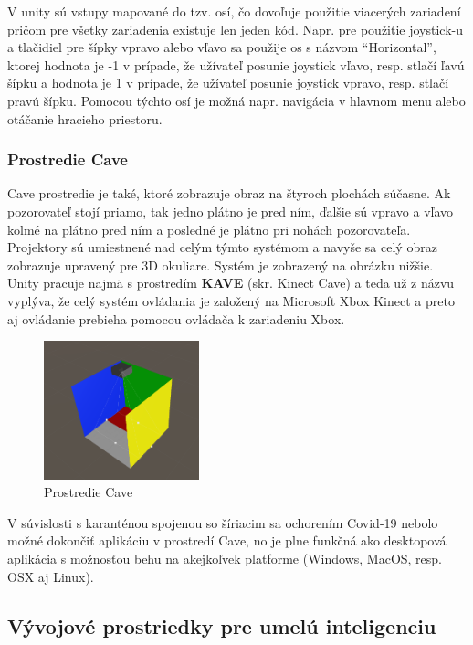V unity sú vstupy mapované do tzv. osí, čo dovoľuje použitie viacerých zariadení pričom pre všetky zariadenia existuje
len jeden kód.
Napr. pre použitie joystick-u a tlačidiel pre šípky vpravo alebo vľavo sa použije os s názvom \enquote{Horizontal},
ktorej hodnota je -1 v prípade, že užívateľ posunie joystick vľavo, resp. stlačí ľavú šípku a hodnota je 1 v prípade,
že užívateľ posunie joystick vpravo, resp. stlačí pravú šípku.
Pomocou týchto osí je možná napr. navigácia v hlavnom menu alebo otáčanie hracieho priestoru.

\subsubsection{Prostredie Cave}
Cave prostredie je také, ktoré zobrazuje obraz na štyroch plochách súčasne.
Ak pozorovateľ stojí priamo, tak jedno plátno je pred ním, ďalšie sú vpravo a vľavo kolmé na plátno pred ním a posledné
je plátno pri nohách pozorovateľa.
Projektory sú umiestnené nad celým týmto systémom a navyše sa celý obraz zobrazuje upravený pre 3D okuliare.
Systém je zobrazený na obrázku nižšie.
Unity pracuje najmä s prostredím \textbf{KAVE} (skr. Kinect Cave) a teda už z názvu vyplýva, že celý systém ovládania
je založený na Microsoft Xbox Kinect a preto aj ovládanie prebieha pomocou ovládača k zariadeniu Xbox.

\begin{figure}[H]
    \centering
    \includegraphics[width=0.4\textwidth]{images/kave.png}
    \caption{Prostredie Cave}
\end{figure}

V súvislosti s karanténou spojenou so šíriacim sa ochorením Covid-19 nebolo možné dokončiť aplikáciu v prostredí Cave,
no je plne funkčná ako desktopová aplikácia s možnosťou behu na akejkoľvek platforme (Windows, MacOS, resp. OSX aj
Linux).

\subsection{Vývojové prostriedky pre umelú inteligenciu}\label{subsec:dev-tools-for-ai}

